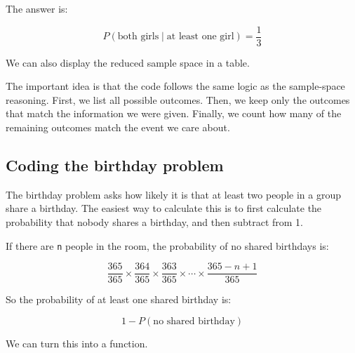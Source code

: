 \documentclass[
  letterpaper,
  DIV=11,
  numbers=noendperiod]{scrreprt}
\begin{document}
The answer is:

\[
P(\text{both girls} \mid \text{at least one girl}) = \frac{1}{3}
\]

We can also display the reduced sample space in a table.

\begin{table}

\caption{\label{tbl-two-daughter}Reduced sample space when at least one
child is a girl}


\end{table}%

The important idea is that the code follows the same logic as the
sample-space reasoning. First, we list all possible outcomes. Then, we
keep only the outcomes that match the information we were given.
Finally, we count how many of the remaining outcomes match the event we
care about.

\subsection{Coding the birthday
problem}\label{coding-the-birthday-problem}

The birthday problem asks how likely it is that at least two people in a
group share a birthday. The easiest way to calculate this is to first
calculate the probability that nobody shares a birthday, and then
subtract from 1.

If there are \texttt{n} people in the room, the probability of no shared
birthdays is:

\[
\frac{365}{365}
\times
\frac{364}{365}
\times
\frac{363}{365}
\times
\cdots
\times
\frac{365-n+1}{365}
\]

So the probability of at least one shared birthday is:

\[
1 - P(\text{no shared birthday})
\]

We can turn this into a function.
\end{document}
